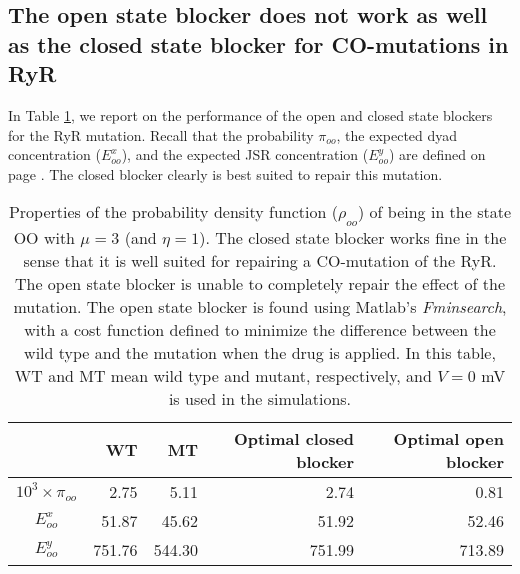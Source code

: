 \subsection{The open state blocker does not work as well as the closed state blocker for CO-mutations in RyR}

In Table \ref{ryr_ob},  we report on the performance of the open and closed state blockers for the RyR mutation. Recall that the probability $\pi_{oo}$, the expected dyad concentration ($E^x_{oo}$), and the expected JSR concentration ($E^y_{oo}$) are defined on page \pageref{statistics}.  The closed blocker clearly is best suited to repair this mutation.





\begin{table}  \begin{center}
\begin{tabular}{|c|r|r|r|r|} \hline
&WT & MT & Optimal closed blocker & Optimal open blocker \\ \hline
$10^3\times\pi_{oo}$&2.75 & 5.11 & 2.74 & 0.81 \\ \hline
$E^x_{oo}$&51.87 & 45.62 & 51.92 & 52.46 \\ \hline
$E^y_{oo}$&751.76 & 544.30 & 751.99 & 713.89 \\ \hline
\end{tabular} \end{center}
\caption{Properties of the probability density function ($\rho_{oo}$) of being in the state OO with $\mu=3$ (and  $\eta=1$). The closed state blocker works fine in the sense that it is well suited for repairing a CO-mutation of the RyR. 
The  open state blocker is unable to completely repair the effect of the mutation. The open state blocker is found using Matlab's {\it Fminsearch},
with a cost function defined to minimize the difference between the wild type and the mutation when the drug is applied.
In this table, WT and MT mean wild type and mutant, respectively, and  $V=0$ mV is used in the simulations.
} \label{ryr_ob}
\end{table}





